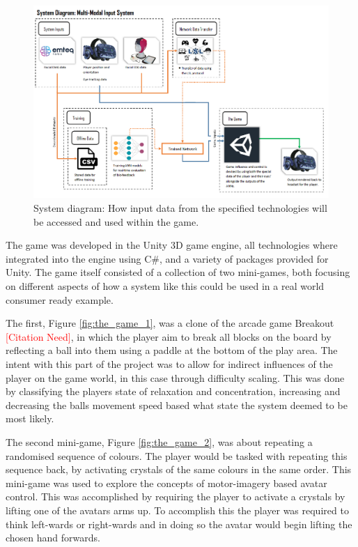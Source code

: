 \documentclass[11pt, a4paper]{article}
\newcommand{\addcitation}{\textcolor{red}{[Citation Need]}}
\newcommand{\reffig}[1]{Figure \ref{#1}}
\begin{document}
\begin{figure}[h!]
	\centering
	\includegraphics[width = 0.9 \linewidth] {[ Figures ]/System Diagram.png}
	\caption{System diagram: How input data from the specified technologies will be accessed and used within the game.}
	\label{fig:system_diagram_:_generic}
\end{figure}



The game was developed in the Unity 3D game engine, all technologies where integrated into the engine using C\#, and a variety of packages provided for Unity. The game itself consisted of a collection of two mini-games, both focusing on different aspects of how a system like this could be used in a real world consumer ready example. 

The first, \reffig{fig:the_game_1}, was a clone of the arcade game Breakout \addcitation{}, in which the player aim to break all blocks on the board by reflecting a ball into them using a paddle at the bottom of the play area. The intent with this part of the project was to allow for indirect influences of the player on the game world, in this case through difficulty scaling. This was done by classifying the players state of relaxation and concentration, increasing and decreasing the balls movement speed based what state the system deemed to be most likely.

The second mini-game, \reffig{fig:the_game_2}, was about repeating a randomised sequence of colours. The player would be tasked with repeating this sequence back, by activating crystals of the same colours in the same order. This mini-game was used to explore the concepts of motor-imagery based avatar control. This was accomplished by requiring the player to activate a crystals by lifting one of the avatars arms up. To accomplish this the player was required to think left-wards or right-wards and in doing so the avatar would begin lifting the chosen hand forwards. 
\end{document}
